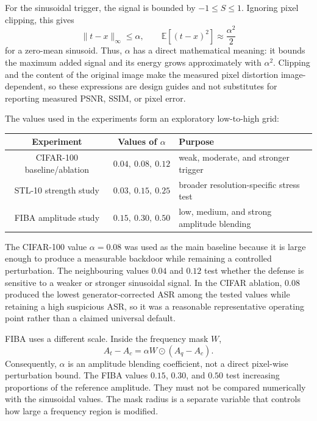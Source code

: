 \documentclass[11pt]{article}
\begin{document}
For the sinusoidal trigger, the signal is bounded by $-1\leq S\leq 1$.
Ignoring pixel clipping, this gives
\begin{equation}
    \|t-x\|_\infty\leq\alpha,
    \qquad
    \mathbb{E}\left[(t-x)^2\right]\approx\frac{\alpha^2}{2}
\end{equation}
for a zero-mean sinusoid. Thus, $\alpha$ has a direct mathematical meaning:
it bounds the maximum added signal and its energy grows approximately with
$\alpha^2$. Clipping and the content of the original image make the measured
pixel distortion image-dependent, so these expressions are design guides and
not substitutes for reporting measured PSNR, SSIM, or pixel error.

The values used in the experiments form an exploratory low-to-high grid:
\begin{center}
\small
\begin{tabular}{c|c|l}
\textbf{Experiment} & \textbf{Values of $\alpha$} & \textbf{Purpose}\\
\hline
CIFAR-100 baseline/ablation & $0.04,\ 0.08,\ 0.12$ & weak, moderate, and stronger trigger\\
STL-10 strength study & $0.03,\ 0.15,\ 0.25$ & broader resolution-specific stress test\\
FIBA amplitude study & $0.15,\ 0.30,\ 0.50$ & low, medium, and strong amplitude blending\\
\end{tabular}
\end{center}

The CIFAR-100 value $\alpha=0.08$ was used as the main baseline because it is
large enough to produce a measurable backdoor while remaining a controlled
perturbation. The neighbouring values $0.04$ and $0.12$ test whether the
defense is sensitive to a weaker or stronger sinusoidal signal. In the CIFAR
ablation, $0.08$ produced the lowest generator-corrected ASR among the tested
values while retaining a high suspicious ASR, so it was a reasonable
representative operating point rather than a claimed universal default.

FIBA uses a different scale. Inside the frequency mask $W$,
\begin{equation}
    A_t-A_c=\alpha W\odot(A_q-A_c).
\end{equation}
Consequently, $\alpha$ is an amplitude blending coefficient, not a direct
pixel-wise perturbation bound. The FIBA values $0.15$, $0.30$, and $0.50$ test
increasing proportions of the reference amplitude. They must not be compared
numerically with the sinusoidal values. The mask radius is a separate variable
that controls how large a frequency region is modified.
\end{document}
